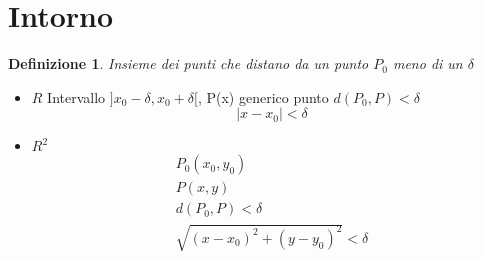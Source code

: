 \documentclass{book}
\newtheorem{defi}{Definizione}
\newcommand{\abs}[1]{\lvert#1\rvert}
\begin{document}
\section{Intorno}
\begin{defi}
  Insieme dei punti che distano da un punto $P_0$ meno di un $\delta$
\end{defi}
\begin{itemize}
\item {\color{red} $R$} Intervallo $]x_0-\delta, x_0+\delta[$, P(x) generico punto $d(P_0,P)<\delta$
  \begin{equation*}
    \boxed{\abs{x-x_0}<\delta}
  \end{equation*}
\item {\color{red} $R^2$}
  \begin{equation*}
    \begin{matrix}
      P_0(x_0,y_0)\\
      P(x,y)\\
      d(P_0,P)<\delta\\
      \boxed{\sqrt{(x-x_0)^2+(y-y_0)^2}<\delta}
    \end{matrix}
  \end{equation*}
\end{itemize}

      
  
\printindex
\end{document}
